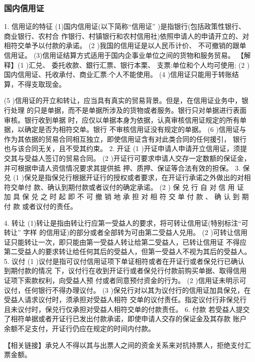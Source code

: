 \documentclass[UTF8,12pt]{ctexart}
\numberwithin{equation}{section} %
\numberwithin{figure}{section}
\numberwithin{table}{section}
\begin{document}
	
	\subsubsection{国内信用证} 
	1. 信用证的特征
	(1)国内信用证(以下简称“信用证” )是指银行(包括政策性银行、商业银行、农村合
	作银行、村镇银行和农村信用社)依照申请人的申请开立的、对相符交单予以付款的承诺。
	(2 )我国的信用证是以人民币计价、 不可撤销的跟单信用证。
	(3)信用证结算方式适用于国内企事业单位之间的货物和服务贸易。
	【解释】(1 )汇兑、 委托收款、銀行汇票、银行本栗、 支票:单位和个人均可使用;
	(2 )国内信用证、托收承付、商业汇票:个人不能使用。
	(4 )信用证只能用于转账结算，不得支取现金。
	
	(5 )信用证的开立和转让，应当具有真实的贸易背景。但是，在信用证业务中，银行处理
	的只是单据，而不是单据所涉及的货物或者服务。银行只对单据进行表面审核。银行收到单据
	时，应仅以单据本身为依据，认真审核信用证规定的所有单据，以确定是否为相符交单。银行
	不审核信用证没有规定的单据。
	(6 )信用证与作为其依据的贸易合同相互独立，即使信用证含有对此类合同的任何援引，
	银行也与该合同无关，且不受其约束。
	2. 开证
	(1 )开证申请人申请开立信用证，须提交其与受益人签订的贸易合同。
	(2 )开证行可要求申请人交存一定数额的保证金，并可根据申请人资信情况要求其提供抵
	押、质押、保证等合法有效的担保。
	3. 保兑
	(1 )保兑是指保兑行根据开证行的授权或者要求，在开证行承诺之外做出的对相符交单付
	款、确认到期付款或者议付的确定承诺。
	(2 ) 保 兑 行 自 对 信 用 证 加 具 保 兑 之 时 起 即 不 可 撤 销 地 承 担 对 相 符 交 单 付 款 、 确 认 到 期 付 款
	或者议付的责任。
	
	
	4. 转让
	(1)转让是指由转让行应第一受益人的要求，将可转让信用证(特别标注“可转让” 字样
	的信用证)的部分或者全部转为可由第二受益人兑用。
	(2 )可转让信用证只能转让一次，即只能由第一受益人转让给第二受益人，已转让信用证
	不得应第二受益人的要求转让给任何其后的受益人，但第一受益人不视为其后的受益人。
	5. 议付
	(1 )议付是指可议付信用证项下单证相符或者在开证行或者保兑行已确认到期付款的情况
	下，议付行在收到开证行或者保兑行付款前购买单据、取得信用证项下索款权利，向受益人预
	付或者同意预付资金的行为。
	(2 )信用证未明示可议付，任何银行不得办理议付。
	(3 )保兑行对以其为议付行的信用证加具保兑，在受益人请求议付时，须承担对受益人相符
	交单的议付责任。指定议付行非保兑行且未议付时，保兑行仅承担对受益人相符交单的付款责任。
	6. 付款
	若受益人提交了相符单据或者开证行已发出付款承诺，即使申请人交存的保证金及其存款
	账户余额不足支付，开证行仍应在规定的时间内付款。
	
	
	
	【相关链接】承兑人不得以其与出票人之间的资金关系来对抗持票人，拒绝支付汇票金额。
	
\end{document}
